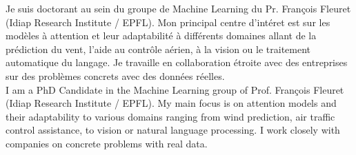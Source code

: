\vspace{4mm}
\color{deepgray}
\small
\ifFrench
  Je suis doctorant au sein du groupe de Machine Learning du Pr. François Fleuret (Idiap Research Institute / EPFL). Mon principal centre d'intéret est sur les modèles à attention et leur adaptabilité à différents domaines allant de la prédiction du vent, l'aide au contrôle aérien, à la vision ou le traitement automatique du langage. Je travaille en collaboration étroite avec des entreprises sur des problèmes concrets avec des données réelles. \\
\else
  I am a PhD Candidate in the Machine Learning group of Prof. François Fleuret (Idiap Research Institute / EPFL). My main focus is on attention models and their adaptability to various domains ranging from wind prediction, air traffic control assistance, to vision or natural language processing. I work closely with companies on concrete problems with real data. \\
\fi
\vspace{4mm}
\color{deepgray}